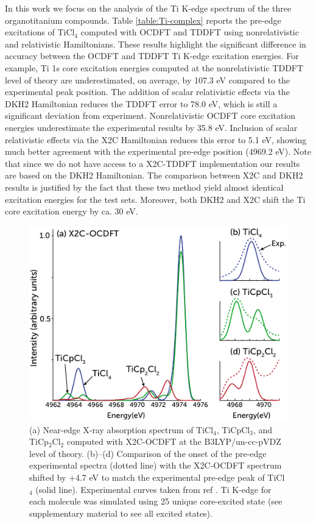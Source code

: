 \documentclass{article}
\begin{document}
In this work we focus on the analysis of the Ti K-edge spectrum of the three organotitanium compounds.
Table \ref{table:Ti-complex} reports the pre-edge excitations of TiCl$_4$ computed with OCDFT and TDDFT using nonrelativistic and relativistic Hamiltonians.
These results highlight the significant difference in accuracy between the OCDFT and TDDFT Ti K-edge excitation energies.
For example, Ti 1s core excitation energies computed at the nonrelativistic TDDFT level of theory are underestimated, on average, by 107.3 eV compared to the experimental peak position. The addition of scalar relativistic effects via the DKH2 Hamiltonian reduces the TDDFT error to 78.0 eV, which is still a significant deviation from experiment. Nonrelativistic OCDFT core excitation energies underestimate the experimental results by 35.8 eV. Inclusion of scalar relativistic effects via the X2C Hamiltonian reduces this error to 5.1 eV, showing much better agreement with the experimental pre-edge position (4969.2 eV).
Note that since we do not have access to a X2C-TDDFT implementation our results are based on the DKH2 Hamiltonian.  The comparison between X2C and DKH2 results is justified by the fact that these two method yield almost identical excitation energies for the test sets.  Moreover, both DKH2 and X2C shift the Ti core excitation energy by ca. 30 eV.

\begin{figure}[t!]
	\centering
	\includegraphics{figure_4.pdf}
	\caption{(a) Near-edge X-ray absorption spectrum of TiCl$_4$, TiCpCl$_3$, and TiCp$_2$Cl$_2$ computed with X2C-OCDFT at the B3LYP/un-cc-pVDZ level of theory.  (b)--(d) Comparison of the onset of the pre-edge experimental spectra (dotted line) with the X2C-OCDFT spectrum shifted by +4.7 eV to match the experimental pre-edge peak of TiCl$_4$ (solid line). Experimental curves taken from ref . Ti K-edge for each molecule was simulated using 25 unique core-excited state (see supplementary material to see all excited states).}
	\label{fig:Ti-spectra}
\end{figure}
\end{document}
